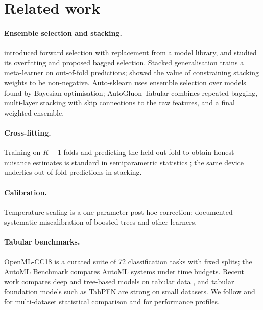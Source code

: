 \section{Related work}
\label{sec:related}

\paragraph{Ensemble selection and stacking.} \citet{caruana2004ensemble}
introduced forward selection with replacement from a model library, and
\citet{caruana2006getting} studied its overfitting and proposed bagged
selection. Stacked generalisation \citep{wolpert1992stacked} trains a
meta-learner on out-of-fold predictions; \citet{breiman1996stacked} showed the
value of constraining stacking weights to be non-negative. Auto-sklearn
\citep{feurer2015efficient} uses ensemble selection over models found by
Bayesian optimisation; AutoGluon-Tabular \citep{erickson2020autogluon} combines
repeated bagging, multi-layer stacking with skip connections to the raw
features, and a final weighted ensemble.

\paragraph{Cross-fitting.} Training on $K-1$ folds and predicting the held-out
fold to obtain honest nuisance estimates is standard in semiparametric
statistics \citep{chernozhukov2018double}; the same device underlies
out-of-fold predictions in stacking.

\paragraph{Calibration.} Temperature scaling \citep{guo2017calibration} is a
one-parameter post-hoc correction; \citet{niculescu2005predicting} documented
systematic miscalibration of boosted trees and other learners.

\paragraph{Tabular benchmarks.} OpenML-CC18 \citep{bischl2021openml} is a curated
suite of 72 classification tasks with fixed splits; the AutoML Benchmark
\citep{gijsbers2024amlb} compares AutoML systems under time budgets. Recent work
compares deep and tree-based models on tabular data
\citep{grinsztajn2022tree,mcelfresh2023neural}, and tabular foundation models
such as TabPFN \citep{hollmann2025tabpfn} are strong on small datasets.
We follow \citet{demsar2006statistical} and \citet{garcia2008extension} for
multi-dataset statistical comparison and \citet{dolan2002benchmarking} for
performance profiles.
